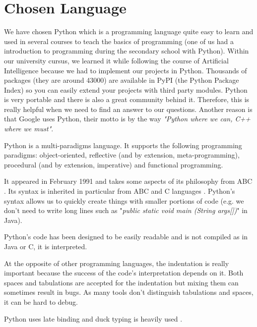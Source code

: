 \section{Chosen Language}
We have chosen Python which is a programming language quite easy to learn and used in several courses to teach the basics of programming (one of us had a introduction to programming during the secondary school with Python). Within our university cursus, we learned it while following the course of Artificial Intelligence because we had to implement our projects in Python. Thousands of packages (they are around 43000) are available in PyPI (the Python Package Index) so you can easily extend your projects with third party modules. Python is very portable and there is also a great community behind it. Therefore, this is really helpful when we need to find an answer to our questions. Another reason is that Google uses Python, their motto is by the way \textit{"Python where we can, C++ where we must"}.
\newline

Python is a multi-paradigms language. It supports the following programming paradigms: object-oriented, reflective (and by extension, meta-programming), procedural (and by extension, imperative) and functional programming.


It appeared in February 1991 and takes some aspects of its philosophy from ABC \cite{python_why}. Its syntax is inherited in particular from ABC and C languages \cite{wikipediaEN_history_python}. Python's syntax allows us to quickly create things with smaller portions of code (e.g. we don't need to write long lines such as "\textit{public static void main (String args[])}" in Java).

Python's code has been designed to be easily readable \cite{ZenPython} and is not compiled as in Java or C, it is interpreted.

At the opposite of other programming languages, the indentation is really important because the success of the code's interpretation depends on it. Both spaces and tabulations are accepted for the indentation but mixing them can sometimes result in bugs. As many tools don't distinguish tabulations and spaces, it can be hard to debug.

Python uses late binding \cite{python_pep0289} and duck typing is heavily used \cite{wikipediaEN_duck_typing_python}.

